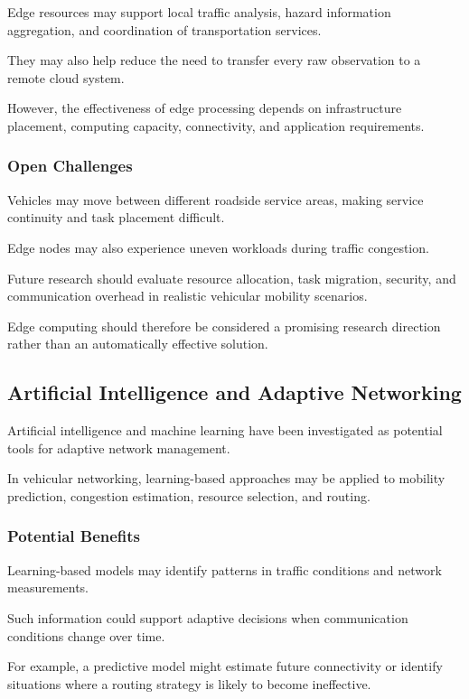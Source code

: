 Edge resources may support
local traffic analysis,
hazard information aggregation,
and coordination of
transportation services.

They may also help reduce
the need to transfer every
raw observation to a
remote cloud system.

However, the effectiveness
of edge processing depends
on infrastructure placement,
computing capacity, connectivity,
and application requirements.

\subsubsection{Open Challenges}

Vehicles may move between
different roadside service areas,
making service continuity
and task placement difficult.

Edge nodes may also experience
uneven workloads during
traffic congestion.

Future research should evaluate
resource allocation, task migration,
security, and communication
overhead in realistic
vehicular mobility scenarios.

Edge computing should therefore
be considered a promising
research direction rather
than an automatically
effective solution.

\subsection{Artificial Intelligence and Adaptive Networking}

Artificial intelligence and
machine learning have been
investigated as potential
tools for adaptive
network management.

In vehicular networking,
learning-based approaches
may be applied to mobility
prediction, congestion
estimation, resource
selection, and routing.

\subsubsection{Potential Benefits}

Learning-based models may
identify patterns in
traffic conditions and
network measurements.

Such information could
support adaptive decisions
when communication conditions
change over time.

For example, a predictive
model might estimate
future connectivity or
identify situations where
a routing strategy is
likely to become ineffective.

